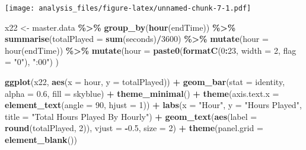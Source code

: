 \documentclass[
]{article}
\newenvironment{Shaded}{\begin{snugshade}}{\end{snugshade}}
\newcommand{\AttributeTok}[1]{\textcolor[rgb]{0.13,0.29,0.53}{#1}}
\newcommand{\DecValTok}[1]{\textcolor[rgb]{0.00,0.00,0.81}{#1}}
\newcommand{\FloatTok}[1]{\textcolor[rgb]{0.00,0.00,0.81}{#1}}
\newcommand{\FunctionTok}[1]{\textcolor[rgb]{0.13,0.29,0.53}{\textbf{#1}}}
\newcommand{\NormalTok}[1]{#1}
\newcommand{\OtherTok}[1]{\textcolor[rgb]{0.56,0.35,0.01}{#1}}
\newcommand{\SpecialCharTok}[1]{\textcolor[rgb]{0.81,0.36,0.00}{\textbf{#1}}}
\newcommand{\StringTok}[1]{\textcolor[rgb]{0.31,0.60,0.02}{#1}}
\begin{document}
\texttt{[image: analysis\_files/figure-latex/unnamed-chunk-7-1.pdf]}

\begin{Shaded}
\begin{Highlighting}[]
\NormalTok{x22 }\OtherTok{\textless{}{-}}\NormalTok{ master.data }\SpecialCharTok{\%\textgreater{}\%}
  \FunctionTok{group\_by}\NormalTok{(}\FunctionTok{hour}\NormalTok{(endTime)) }\SpecialCharTok{\%\textgreater{}\%}
  \FunctionTok{summarise}\NormalTok{(}\AttributeTok{totalPlayed =} \FunctionTok{sum}\NormalTok{(seconds)}\SpecialCharTok{/}\DecValTok{3600}\NormalTok{) }\SpecialCharTok{\%\textgreater{}\%}
  \FunctionTok{mutate}\NormalTok{(}\AttributeTok{hour =} \StringTok{\textasciigrave{}}\AttributeTok{hour(endTime)}\StringTok{\textasciigrave{}}\NormalTok{) }\SpecialCharTok{\%\textgreater{}\%}
  \FunctionTok{mutate}\NormalTok{(}\AttributeTok{hour =} \FunctionTok{paste0}\NormalTok{(}\FunctionTok{formatC}\NormalTok{(}\DecValTok{0}\SpecialCharTok{:}\DecValTok{23}\NormalTok{, }\AttributeTok{width =} \DecValTok{2}\NormalTok{, }\AttributeTok{flag =} \StringTok{"0"}\NormalTok{), }\StringTok{":00"}\NormalTok{)}
\NormalTok{)}

\FunctionTok{ggplot}\NormalTok{(x22, }\FunctionTok{aes}\NormalTok{(}\AttributeTok{x =}\NormalTok{ hour, }\AttributeTok{y =}\NormalTok{ totalPlayed)) }\SpecialCharTok{+} \FunctionTok{geom\_bar}\NormalTok{(}\AttributeTok{stat =} \StringTok{\textquotesingle{}identity\textquotesingle{}}\NormalTok{, }\AttributeTok{alpha =} \FloatTok{0.6}\NormalTok{, }\AttributeTok{fill =} \StringTok{\textquotesingle{}skyblue\textquotesingle{}}\NormalTok{) }\SpecialCharTok{+} 
  \FunctionTok{theme\_minimal}\NormalTok{() }\SpecialCharTok{+}
  \FunctionTok{theme}\NormalTok{(}\AttributeTok{axis.text.x =} \FunctionTok{element\_text}\NormalTok{(}\AttributeTok{angle =} \DecValTok{90}\NormalTok{, }\AttributeTok{hjust =} \DecValTok{1}\NormalTok{)) }\SpecialCharTok{+}
  \FunctionTok{labs}\NormalTok{(}\AttributeTok{x =} \StringTok{"Hour"}\NormalTok{, }\AttributeTok{y =} \StringTok{"Hours Played"}\NormalTok{, }\AttributeTok{title =} \StringTok{"Total Hours Played By Hourly"}\NormalTok{) }\SpecialCharTok{+}
  \FunctionTok{geom\_text}\NormalTok{(}\FunctionTok{aes}\NormalTok{(}\AttributeTok{label =} \FunctionTok{round}\NormalTok{(totalPlayed, }\DecValTok{2}\NormalTok{)), }\AttributeTok{vjust =} \SpecialCharTok{{-}}\FloatTok{0.5}\NormalTok{, }\AttributeTok{size =} \DecValTok{2}\NormalTok{) }\SpecialCharTok{+} 
  \FunctionTok{theme}\NormalTok{(}\AttributeTok{panel.grid =} \FunctionTok{element\_blank}\NormalTok{())}
\end{Highlighting}
\end{Shaded}
\end{document}

